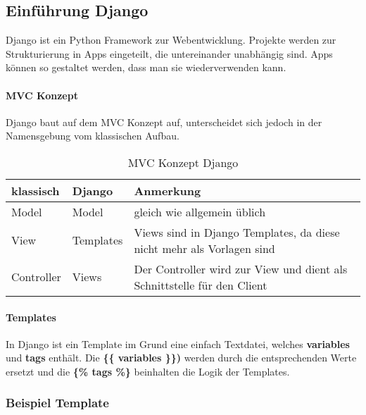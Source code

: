 \subsection{Einführung Django}
Django \cite{django} ist ein Python Framework zur Webentwicklung. Projekte werden zur Strukturierung in Apps eingeteilt, die untereinander unabhängig sind. Apps können so gestaltet werden, dass man sie wiederverwenden kann.
\paragraph{MVC Konzept}
Django baut auf dem MVC Konzept auf, unterscheidet sich jedoch in der Namensgebung vom klassischen Aufbau. 
\medskip
\begin{table}[H]
\centering
    \begin{tabular}{|l|l|l|}
    \hline    
    \rowcolor{lightblue}
	klassisch & Django & Anmerkung \\ \hline
	Model & Model & gleich wie allgemein üblich \\ \hline
	View & Templates & Views sind in Django Templates, da diese nicht mehr als Vorlagen sind \\ \hline
	Controller & Views & Der Controller wird zur View und dient als Schnittstelle für den Client \\ \hline
    \end{tabular}
    \caption[MVC Konzept Django]{MVC Konzept Django}
\end{table}

\paragraph{Templates}
In Django ist ein Template im Grund eine einfach Textdatei, welches \textbf{variables} und \textbf{tags} enthält. Die \textbf{\{\{ variables \}\})} werden durch die entsprechenden Werte ersetzt und die \textbf{\{\% tags \%\}} beinhalten die Logik der Templates.

\subsubsection{Beispiel Template}

